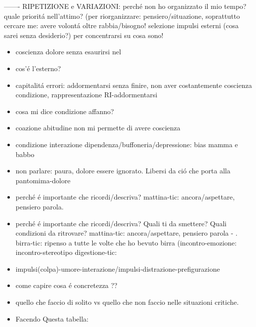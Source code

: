 -------
RIPETIZIONE e VARIAZIONI: perch\'e non ho organizzato il mio tempo? quale priorit\'a nell'attimo?
(per riorganizzare: pensiero/situazione, soprattutto cercare me: avere volont\'a oltre rabbia/bisogno! selezione impulsi esterni (cosa sarei senza desiderio?) per concentrarsi su cosa sono!
\begin{itemize}
\item coscienza dolore senza esaurirsi nel
\item cos'\'e l'esterno?
\item capitalit\'a errori: addormentarsi senza finire, non aver costantemente coscienza condizione, rappresentazione RI-addormentarsi
\item cosa mi dice condizione affanno?
\item coazione abitudine non mi permette di avere coscienza
\item condizione interazione dipendenza/buffoneria/depressione: bias mamma e babbo
\item non parlare: paura, dolore essere ignorato. Libersi da ci\'o che porta alla pantomima-dolore
\item perch\'e \'e importante che ricordi/descriva?
mattina-tic: ancora/aspettare, pensiero parola.
\item perch\'e \'e importante che ricordi/descriva? Quali ti da smettere? Quali condizioni da ritrovare?
mattina-tic: ancora/aspettare, pensiero parola - .
birra-tic: ripenso a tutte le volte che ho bevuto birra (incontro-emozione: incontro-stereotipo
digestione-tic:
\item impulsi(colpa)-umore-interazione/impulsi-distrazione-prefigurazione
\item come capire cosa \'e concretezza ??
\item quello che faccio di solito vs quello che non faccio nelle situazioni critiche.
\item Facendo Questa tabella:


\end{itemize}
